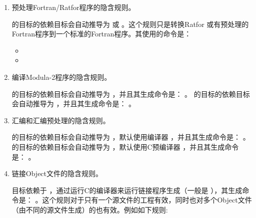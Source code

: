 \documentclass[a4paper,10pt]{sphinxmanual}
\begin{document}
\begin{enumerate}
\begin{itemize}
\end{itemize}

\item {} 
预处理Fortran/Ratfor程序的隐含规则。

 的目标的依赖目标会自动推导为  或  。这个规则只是转换Ratfor
或有预处理的Fortran程序到一个标准的Fortran程序。其使用的命令是：
\begin{itemize}
\item {} 
  

\item {} 
  

\end{itemize}

\item {} 
编译Modula-2程序的隐含规则。

 的目标的依赖目标会自动推导为  ，并且其生成命令是：
 。  的目标的依赖目标会自动推导为  ，并且其生成命令是：  。

\item {} 
汇编和汇编预处理的隐含规则。

 的目标的依赖目标会自动推导为  ，默认使用编译器  ，并且其生成命令是：  。  的目标的依赖目标会自动推导为  ，默认使用C预编译器  ，并且其生成命令是：  。

\item {} 
链接Object文件的隐含规则。

 目标依赖于  ，通过运行C的编译器来运行链接程序生成（一般是  ），其生成命令是：  。这个规则对于只有一个源文件的工程有效，同时也对多个Object文件（由不同的源文件生成）的也有效。例如如下规则:


\end{enumerate}
\end{document}
